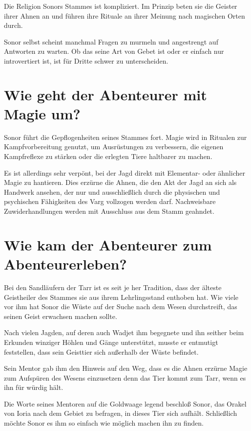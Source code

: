 \documentclass{article}
\begin{document}
	Die Religion Sonors Stammes ist kompliziert. Im Prinzip beten sie die
	Geister ihrer Ahnen an und führen ihre Rituale an ihrer Meinung nach magischen
	Orten durch.

	Sonor selbst scheint manchmal Fragen zu murmeln und angestrengt auf
	Antworten zu warten. Ob das seine Art von Gebet ist oder er einfach nur
	introvertiert ist, ist für Dritte schwer zu unterscheiden.


	\section[Magie]{Wie geht der Abenteurer mit Magie um?}

	Sonor führt die Gepflogenheiten seines Stammes fort. Magie wird in
	Ritualen zur Kampfvorbereitung genutzt, um Ausrüstungen zu verbessern,
	die eigenen Kampfreflexe zu stärken oder die erlegten Tiere haltbarer zu
	machen.

	Es ist allerdings sehr verpönt, bei der Jagd direkt mit Elementar- oder
	ähnlicher Magie zu hantieren. Dies erzürne die Ahnen, die den Akt der Jagd an
	sich als Handwerk ansehen, der nur und ausschließlich durch die
	physischen und psychischen Fähigkeiten des Varg vollzogen werden darf.
	Nachweisbare Zuwiderhandlungen werden mit Ausschluss aus dem Stamm geahndet.


	\section[Schicksal]{Wie kam der Abenteurer zum Abenteurerleben?}

	Bei den Sandläufern der Tarr ist es seit je her Tradition, dass der
	älteste Geistheiler des Stammes sie aus ihrem Lehrlingsstand enthoben
	hat. Wie viele vor ihm hat Sonor die Wüste auf der Suche nach dem Wesen
	durchstreift, das seinen Geist erwachsen machen sollte. 

	Nach vielen Jagden, auf deren auch Wadjet ihm begegnete und ihn seither
	beim Erkunden winziger Höhlen und Gänge unterstützt, musste er entmutigt
	feststellen, dass sein Geisttier sich außerhalb der Wüste befindet.

	Sein Mentor gab ihm den Hinweis auf den Weg, dass es die Ahnen erzürne
	Magie zum Aufspüren des Wesens einzusetzen denn das Tier kommt zum Tarr,
	wenn es ihn für würdig hält.

	Die Worte seines Mentoren auf die Goldwaage legend beschloß Sonor, das
	Orakel von Ioria nach dem Gebiet zu befragen, in dieses Tier sich
	aufhält. Schließlich möchte Sonor es ihm so einfach wie möglich machen
	ihn zu finden.
\end{document}
